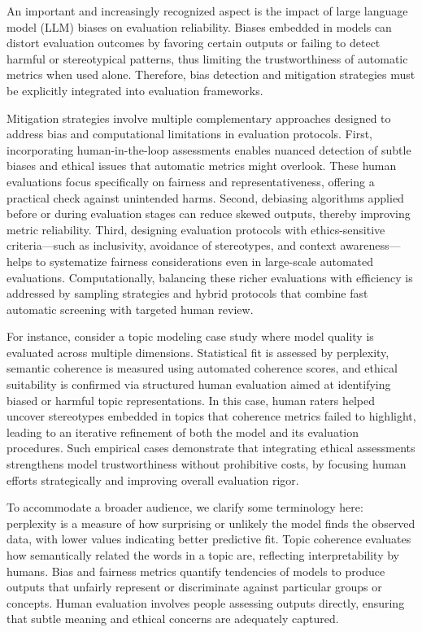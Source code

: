 \documentclass[sigconf]{acmart}
\begin{document}
An important and increasingly recognized aspect is the impact of large language model (LLM) biases on evaluation reliability. Biases embedded in models can distort evaluation outcomes by favoring certain outputs or failing to detect harmful or stereotypical patterns, thus limiting the trustworthiness of automatic metrics when used alone. Therefore, bias detection and mitigation strategies must be explicitly integrated into evaluation frameworks.

Mitigation strategies involve multiple complementary approaches designed to address bias and computational limitations in evaluation protocols. First, incorporating human-in-the-loop assessments enables nuanced detection of subtle biases and ethical issues that automatic metrics might overlook. These human evaluations focus specifically on fairness and representativeness, offering a practical check against unintended harms. Second, debiasing algorithms applied before or during evaluation stages can reduce skewed outputs, thereby improving metric reliability. Third, designing evaluation protocols with ethics-sensitive criteria—such as inclusivity, avoidance of stereotypes, and context awareness—helps to systematize fairness considerations even in large-scale automated evaluations. Computationally, balancing these richer evaluations with efficiency is addressed by sampling strategies and hybrid protocols that combine fast automatic screening with targeted human review.

For instance, consider a topic modeling case study where model quality is evaluated across multiple dimensions. Statistical fit is assessed by perplexity, semantic coherence is measured using automated coherence scores, and ethical suitability is confirmed via structured human evaluation aimed at identifying biased or harmful topic representations. In this case, human raters helped uncover stereotypes embedded in topics that coherence metrics failed to highlight, leading to an iterative refinement of both the model and its evaluation procedures. Such empirical cases demonstrate that integrating ethical assessments strengthens model trustworthiness without prohibitive costs, by focusing human efforts strategically and improving overall evaluation rigor.

To accommodate a broader audience, we clarify some terminology here: perplexity is a measure of how surprising or unlikely the model finds the observed data, with lower values indicating better predictive fit. Topic coherence evaluates how semantically related the words in a topic are, reflecting interpretability by humans. Bias and fairness metrics quantify tendencies of models to produce outputs that unfairly represent or discriminate against particular groups or concepts. Human evaluation involves people assessing outputs directly, ensuring that subtle meaning and ethical concerns are adequately captured.
\end{document}
